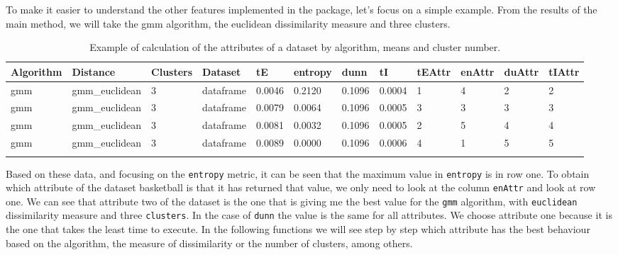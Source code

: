 To make it easier to understand the other features implemented in the package, let's focus on a simple example.
From the results of the main method, we will take the gmm algorithm, the euclidean dissimilarity measure and three clusters.
{\small
\begin{longtable}{| p{1cm} | p{1.8cm} | p{0.7cm} | p{0.9cm} | p{0.5cm} | p{0.65cm} | p{0.5cm} | p{0.5cm} | p{0.55cm} | p{0.55cm} | p{0.6cm} | p{0.5cm} |}
\hline
\scriptsize  Algorithm & \scriptsize  Distance  &  \scriptsize Clusters & \scriptsize  Dataset & \scriptsize tE & \scriptsize entropy & \scriptsize  dunn  & \scriptsize tI & \scriptsize tEAttr & \scriptsize enAttr & \scriptsize duAttr & \scriptsize tIAttr  \\
\hline
\rowcolor{green}  \scriptsize     gmm   & \scriptsize   gmm\_euclidean  & \scriptsize    3   &  \scriptsize dataframe  & \scriptsize    0.0046  &  \scriptsize 0.2120  & \scriptsize 0.1096 & \scriptsize    0.0004 &   \scriptsize    1  & \scriptsize    4 &  \scriptsize    2 &  \scriptsize    2 \\
\scriptsize     gmm   & \scriptsize   gmm\_euclidean & \scriptsize    3   &  \scriptsize dataframe & \scriptsize    0.0079  &  \scriptsize 0.0064  &\scriptsize 0.1096 & \scriptsize    0.0005 &   \scriptsize    3  &  \scriptsize    3  &  \scriptsize    3  & \scriptsize    3 \\
\scriptsize     gmm   & \scriptsize   gmm\_euclidean & \scriptsize    3 &  \scriptsize dataframe & \scriptsize    0.0081  &  \scriptsize 0.0032  & \scriptsize 0.1096 & \scriptsize    0.0005 &   \scriptsize    2  & \scriptsize    5  & \scriptsize    4  & \scriptsize    4 \\
\scriptsize     gmm   & \scriptsize   gmm\_euclidean & \scriptsize    3     & \scriptsize dataframe & \scriptsize    0.0089  &  \scriptsize 0.0000 &  \scriptsize 0.1096 & \scriptsize    0.0006 &   \scriptsize    4  & \scriptsize    1  & \scriptsize    5  & \scriptsize    5 \\
\hline
\caption{Example of calculation of the attributes of a dataset by algorithm, means and cluster number.}
\label{tab:clusteringExample}
\end{longtable}}

Based on these data, and focusing on the \texttt{entropy} metric, it can be seen that the maximum value in \texttt{entropy} is in row one. To obtain which attribute of the dataset basketball is that it has returned that value, we only need to look at the column \texttt{enAttr} and look at row one. We can see that attribute two of the dataset is the one that is giving me the best value for the \texttt{gmm} algorithm, with \texttt{euclidean} dissimilarity measure and three \texttt{clusters}. In the case of \texttt{dunn} the value is the same for all attributes. We choose attribute one because it is the one that takes the least time to execute. In the following functions we will see step by step which attribute has the best behaviour based on the algorithm, the measure of dissimilarity or the number of clusters, among others.

